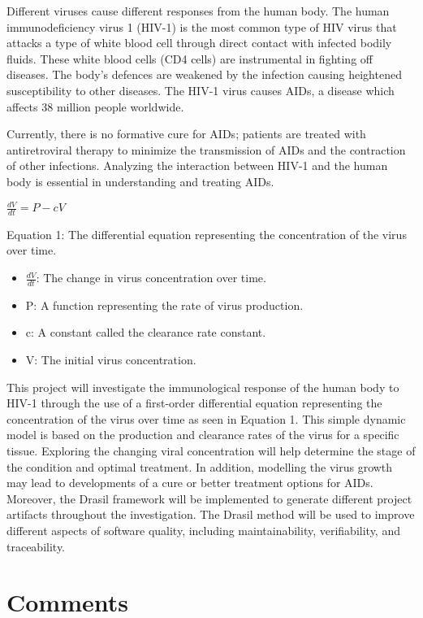 \documentclass{article}
\begin{document}
Different viruses cause different responses from the human body. The human 
immunodeficiency virus 1 (HIV-1) is the most common type of HIV virus that 
attacks a type of white blood cell through direct contact with infected bodily 
fluids. These white blood cells (CD4 cells) are instrumental in fighting off 
diseases. The body’s defences are weakened by the infection causing heightened 
susceptibility to other diseases. The HIV-1 virus causes AIDs, a disease which 
affects 38 million people worldwide. 

Currently, there is no formative cure for AIDs; patients are treated with 
antiretroviral therapy to minimize the transmission of AIDs and the contraction 
of other infections. Analyzing the interaction between HIV-1 and the human body 
is essential in understanding and treating AIDs. 

\begin{center}
$\frac{dV}{dt}= P - cV$

Equation 1: The differential equation representing the concentration of the 
virus over time. 
\end{center}

\begin{itemize}
	\item $\frac{dV}{dt}$: The change in virus concentration over time. 
	\item P: A function representing the rate of virus production. 
	\item c: A constant called the clearance rate constant.
	\item V: The initial virus concentration.
\end{itemize}

This project will investigate the immunological response of the human body to 
HIV-1 through the use of a first-order differential equation representing the 
concentration of the virus over time as seen in Equation  1. This simple dynamic 
model is based on the production and clearance rates of the virus for a specific 
tissue.  Exploring the changing viral concentration will help determine the 
stage of the condition and optimal treatment. In addition, modelling the virus 
growth may lead to developments of a cure or better treatment options for AIDs. 
Moreover, the Drasil framework will be implemented to generate different project 
artifacts throughout the investigation. The Drasil method will be used to 
improve different aspects of software quality, including maintainability, 
verifiability, and traceability.


\newpage
\section{Comments}

\iffalse
\wss{comment}
\amc{comment}
\fi
\end{document}
